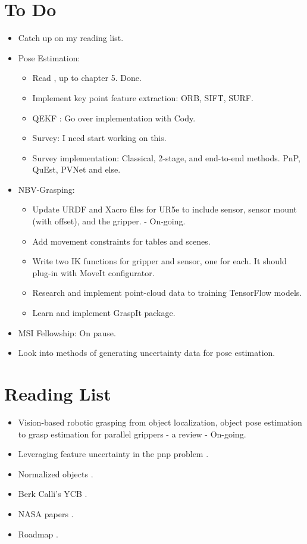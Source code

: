 \documentclass[11pt]{article}
\begin{document}
\section{To Do}
\begin{itemize}
  \item Catch up on my reading list.
  \item Pose Estimation:
  \begin{itemize}
      \item Read \cite{ma2012invitation}, up to chapter 5. Done.
      \item Implement key point feature extraction: ORB, SIFT, SURF.
      \item QEKF \cite{6577984}: Go over implementation with Cody.
      \item Survey: I need start working on this.
      \item Survey implementation: Classical, 2-stage, and end-to-end methods. PnP, QuEst, PVNet and else.
  \end{itemize}
  \item NBV-Grasping:
      \begin{itemize}
      \item Update URDF and Xacro files for UR5e to include sensor,
sensor mount (with offset), and the gripper. - On-going.
      \item Add movement constraints for tables and scenes.
      \item Write two IK functions for gripper and sensor, one for each. It should plug-in with MoveIt configurator.
      \item Research and implement point-cloud data to training TensorFlow models.
      \item Learn and implement GraspIt package.
      \end{itemize}

  \item MSI Fellowship: On pause.
  \item Look into methods of generating uncertainty data for pose estimation.
\end{itemize}

\section{Reading List}
\begin{itemize}
      \item Vision-based robotic grasping from object localization, object pose estimation to grasp estimation for parallel grippers - a review \cite{du2020vision} - On-going.
      \item Leveraging feature uncertainty in the pnp problem \cite{ferraz2014leveraging}.
      \item Normalized objects \cite{Wang_2019_CVPR}.
      \item Berk Calli's YCB \cite{calli2015ycb}.
      \item NASA papers \cite{NASATech44:online}.
      \item Roadmap \cite{roadmap251:online}.
\end{itemize}
\end{document}
